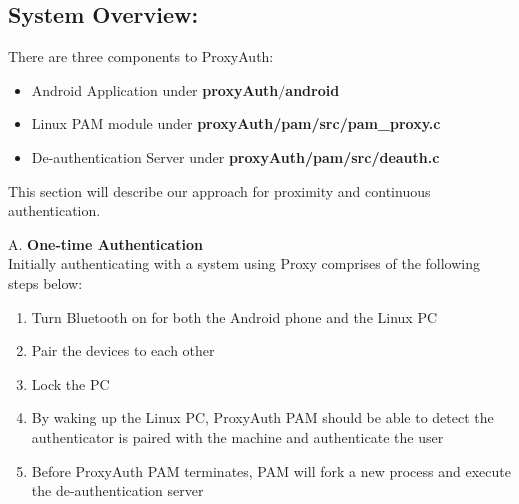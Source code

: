 \documentclass[letterpaper,twocolumn,10pt]{article}
\begin{document}
\subsection{System Overview:}
There are three components to ProxyAuth:
\begin{itemize}[noitemsep]
\item Android Application under \textbf{proxyAuth$/$android}
\item Linux PAM module under \textbf{proxyAuth/pam/src/pam\_proxy.c}
\item De-authentication Server under \textbf{proxyAuth/pam/src/deauth.c}

\end{itemize}
This section will describe our approach for proximity and continuous authentication.

A. \textbf{One-time Authentication}\\
Initially authenticating with a system using Proxy comprises of the following steps below:
\begin{enumerate}[noitemsep]
\item Turn Bluetooth on for both the Android phone and the Linux PC
\item Pair the devices to each other
\item Lock the PC
\item By waking up the Linux PC, ProxyAuth PAM should be able to detect the authenticator is paired with the machine and authenticate the user
\item Before ProxyAuth PAM terminates, PAM will fork a new process and execute the de-authentication server
\end{enumerate}
\end{document}
